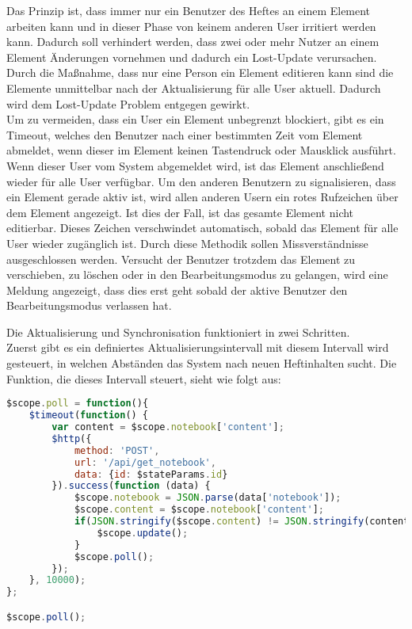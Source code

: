 Das Prinzip ist, dass immer nur ein Benutzer des Heftes an einem Element arbeiten kann und in dieser Phase von keinem anderen User irritiert werden kann. Dadurch soll verhindert werden, dass zwei oder mehr Nutzer an einem Element Änderungen vornehmen und dadurch ein Lost-Update verursachen. Durch die Maßnahme, dass nur eine Person ein Element editieren kann sind die Elemente unmittelbar nach der Aktualisierung für alle User aktuell. Dadurch wird dem Lost-Update Problem entgegen gewirkt.\cite{LOSTUPDATE}\\
Um zu vermeiden, dass ein User ein Element unbegrenzt blockiert, gibt es ein Timeout, welches den Benutzer nach einer bestimmten Zeit vom Element abmeldet, wenn dieser im Element keinen Tastendruck oder Mausklick ausführt. Wenn dieser User vom System abgemeldet wird, ist das Element anschließend wieder für alle User verfügbar.
\newpage
Um den anderen Benutzern zu signalisieren, dass ein Element gerade aktiv ist, wird allen anderen Usern ein rotes Rufzeichen über dem Element angezeigt. Ist dies der Fall, ist das gesamte Element nicht editierbar. 
Dieses Zeichen verschwindet automatisch, sobald das Element für alle User wieder zugänglich ist. Durch diese Methodik sollen Missverständnisse ausgeschlossen werden. Versucht der Benutzer trotzdem das Element zu verschieben, zu löschen oder in den Bearbeitungsmodus zu gelangen, wird eine Meldung angezeigt, dass dies erst geht sobald der aktive Benutzer den Bearbeitungsmodus verlassen hat. 

Die Aktualisierung und Synchronisation funktioniert in zwei Schritten.\\
Zuerst gibt es ein definiertes Aktualisierungsintervall mit diesem Intervall wird gesteuert, in welchen Abständen das System nach neuen Heftinhalten sucht. Die Funktion, die dieses Intervall steuert, sieht wie folgt aus:
\begin{lstlisting}[caption={Aktualisierung - PWS}, language=Javascript]
$scope.poll = function(){
    $timeout(function() {
        var content = $scope.notebook['content'];
        $http({
            method: 'POST',
            url: '/api/get_notebook',
            data: {id: $stateParams.id}
        }).success(function (data) {
            $scope.notebook = JSON.parse(data['notebook']);
            $scope.content = $scope.notebook['content'];
            if(JSON.stringify($scope.content) != JSON.stringify(content)) {
                $scope.update();
            }
            $scope.poll();
        });
    }, 10000);
};

$scope.poll();
\end{lstlisting}

